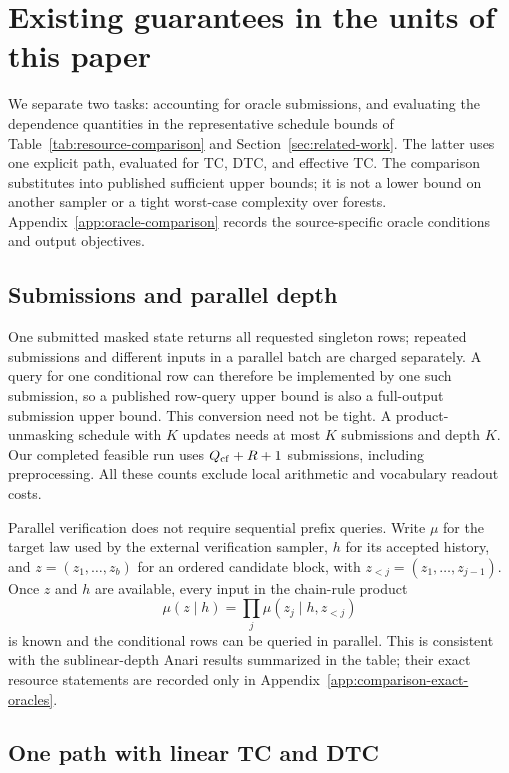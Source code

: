 \section{Existing guarantees in the units of this paper}
\label{app:comparison}

We separate two tasks: accounting for oracle submissions, and evaluating
the dependence quantities in the representative schedule bounds of
Table~\ref{tab:resource-comparison} and Section~\ref{sec:related-work}.
The latter uses one explicit path, evaluated for TC, DTC, and effective TC.
The comparison substitutes into
published sufficient upper bounds; it is not a lower bound on another
sampler or a tight worst-case complexity over forests.
Appendix~\ref{app:oracle-comparison} records the source-specific oracle
conditions and output objectives.

\subsection{Submissions and parallel depth}
\label{app:comparison-states}

One submitted masked state returns all requested singleton rows; repeated
submissions and different inputs in a parallel batch are charged separately.
A query for one conditional row can therefore be implemented by one such
submission, so a published row-query upper bound is also a full-output
submission upper bound.  This conversion need not be tight.
A product-unmasking schedule with $K$ updates needs at most $K$ submissions
and depth $K$.  Our completed feasible run uses
$Q_{\mathrm{cf}}+R+1$ submissions, including preprocessing.
All these counts exclude local arithmetic and vocabulary readout costs.

Parallel verification does not require sequential prefix queries.
Write $\mu$ for the target law used by the external verification sampler,
$h$ for its accepted history, and
$z=(z_1,\ldots,z_b)$ for an ordered candidate block, with
$z_{<j}=(z_1,\ldots,z_{j-1})$.
Once $z$ and $h$ are available, every input in
the chain-rule product
\[
 \mu(z\mid h)=\prod_j\mu(z_j\mid h,z_{<j})
\]
is known and the conditional rows can be queried in parallel.
This is consistent with the sublinear-depth Anari results summarized in
the table; their exact resource statements are recorded only in
Appendix~\ref{app:comparison-exact-oracles}.

\subsection{One path with linear TC and DTC}
\label{app:comparison-path}

